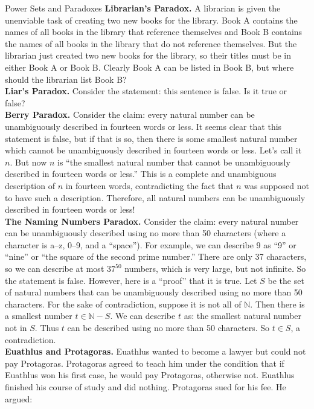 \begin{section}{Power Sets and Paradoxes}
\noindent \textbf{Librarian's Paradox.} A librarian is given the unenviable task of creating two new books for the library. Book A contains the names of all books in the library that reference themselves and Book B contains the names of all books in the library that do not reference themselves. But the librarian just created two new books for the library, so their titles must be in either Book A or Book B. Clearly Book A can be listed in Book B, but where should the librarian list Book B?\\

\noindent \textbf{Liar's Paradox.} Consider the statement: this sentence is false. Is it true or false?\\

\noindent \textbf{Berry Paradox.} Consider the claim: every natural number can be unambiguously described in fourteen words or less. It seems clear that this statement is false, but if that is so, then there is some smallest natural number which cannot be unambiguously described in fourteen words or less. Let's call it $n$. But now $n$ is ``the smallest natural number that cannot be unambiguously described in fourteen words or less.'' This is a complete and unambiguous description of $n$ in fourteen words, contradicting the fact that $n$ was supposed not to have such a description. Therefore, all natural numbers can be unambiguously described in fourteen words or less!\\

\noindent \textbf{The Naming Numbers Paradox.} Consider the claim: every natural number can be unambiguously described using no more than 50 characters (where a character is a--z, 0--9, and a ``space''). For example, we can describe 9 as ``9'' or ``nine'' or ``the square of the second prime number.'' There are only 37 characters, so we can describe at most $37^{50}$ numbers, which is very large, but not infinite. So the statement is false. However, here is a ``proof'' that it is true. Let $S$ be the set of natural numbers that can be unambiguously described using no more than 50 characters. For the sake of contradiction, suppose it is not all of $\mathbb{N}$. Then there is a smallest number $t\in\mathbb{N}-S$. We can describe $t$ as: the smallest natural number not in $S$.  Thus $t$ can be described using no more than 50 characters. So $t\in S$, a contradiction.\\

\noindent \textbf{Euathlus and Protagoras.} Euathlus wanted to become a lawyer but could not pay Protagoras. Protagoras agreed to teach him under the condition that if Euathlus won his first case, he would pay Protagoras, otherwise not. Euathlus finished his course of study and did nothing. Protagoras sued for his fee. He argued:\\


\end{section}
